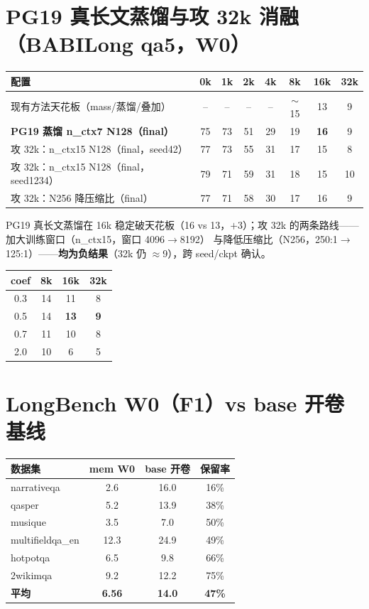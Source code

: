 \documentclass[11pt,a4paper]{ctexart}
\begin{document}
\section{PG19 真长文蒸馏与攻 32k 消融（BABILong qa5，W0）}
\begin{center}\small
\begin{tabular}{lccccccc}
\toprule
\textbf{配置} & \textbf{0k} & \textbf{1k} & \textbf{2k} & \textbf{4k} & \textbf{8k} & \textbf{16k} & \textbf{32k}\\
\midrule
现有方法天花板（mass/蒸馏/叠加） & -- & -- & -- & -- & $\sim$15 & 13 & 9\\
\textbf{PG19 蒸馏 n\_ctx7 N128（final）} & 75 & 73 & 51 & 29 & 19 & \textbf{16} & 9\\
\quad 攻 32k：n\_ctx15 N128（final，seed42） & 77 & 73 & 55 & 31 & 17 & 15 & 8\\
\quad 攻 32k：n\_ctx15 N128（final，seed1234） & 79 & 71 & 59 & 31 & 18 & 15 & 10\\
\quad 攻 32k：N256 降压缩比（final） & 77 & 71 & 58 & 30 & 17 & 16 & 9\\
\bottomrule
\end{tabular}
\end{center}
\noindent\footnotesize
PG19 真长文蒸馏在 16k 稳定破天花板（16 vs 13，$+3$）；攻 32k 的两条路线——加大训练窗口（n\_ctx15，窗口 4096$\to$8192）
与降低压缩比（N256，250:1$\to$125:1）——\textbf{均为负结果}（32k 仍 $\approx$9），跨 seed/ckpt 确认。
\normalsize


\begin{center}
\begin{tabular}{cccc}
\toprule
\textbf{coef} & \textbf{8k} & \textbf{16k} & \textbf{32k}\\
\midrule
0.3 & 14 & 11 & 8\\
0.5 & 14 & \textbf{13} & \textbf{9}\\
0.7 & 11 & 10 & 8\\
2.0 & 10 & 6 & 5\\
\bottomrule
\end{tabular}
\end{center}

\section{LongBench W0（F1）vs base 开卷基线}
\begin{center}
\begin{tabular}{lccc}
\toprule
\textbf{数据集} & \textbf{mem W0} & \textbf{base 开卷} & \textbf{保留率}\\
\midrule
narrativeqa & 2.6 & 16.0 & 16\%\\
qasper & 5.2 & 13.9 & 38\%\\
musique & 3.5 & 7.0 & 50\%\\
multifieldqa\_en & 12.3 & 24.9 & 49\%\\
hotpotqa & 6.5 & 9.8 & 66\%\\
2wikimqa & 9.2 & 12.2 & 75\%\\
\midrule
\textbf{平均} & \textbf{6.56} & \textbf{14.0} & \textbf{47\%}\\
\bottomrule
\end{tabular}
\end{center}
\end{document}
